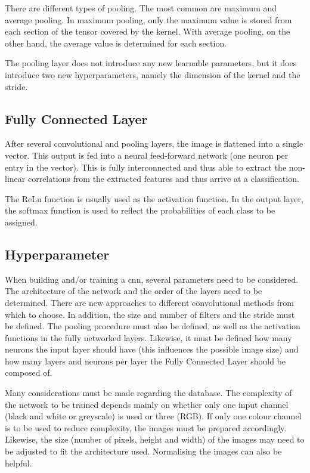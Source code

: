 There are different types of pooling. The most common are maximum and average pooling. In maximum pooling, only the maximum value is stored from each section of the tensor covered by the kernel. With average pooling, on the other hand, the average value is determined for each section. \cite{Saha:2018}

The pooling layer does not introduce any new learnable parameters, but it does introduce two new hyperparameters, namely the dimension of the kernel and the stride. \cite{Michelucci:2019}

\subsection{Fully Connected Layer}

After several convolutional and pooling layers, the image is flattened into a single vector. This output is fed into a neural feed-forward network (one neuron per entry in the vector). This is fully interconnected and thus able to extract the non-linear correlations from the extracted features and thus arrive at a classification.\cite{Saha:2018}

The ReLu function is usually used as the activation function. In the output layer, the softmax function is used to reflect the probabilities of each class to be assigned. \cite{Arunava:2018}

\subsection{Hyperparameter}

When building and/or training a \ac{cnn}, several parameters need to be considered. The architecture of the network and the order of the layers need to be determined. There are new approaches to different convolutional methods from which to choose. In addition, the size and number of filters and the stride must be defined. The pooling procedure must also be defined, as well as the activation functions in the fully networked layers. Likewise, it must be defined how many neurons the input layer should have (this influences the possible image size) and how many layers and neurons per layer the Fully Connected Layer should be composed of.

Many considerations must be made regarding the database. The complexity of the network to be trained depends mainly on whether only one input channel (black and white or greyscale) is used or three (RGB). If only one colour channel is to be used to reduce complexity, the images must be prepared accordingly. Likewise, the size (number of pixels, height and width) of the images may need to be adjusted to fit the architecture used. Normalising the images can also be helpful.

